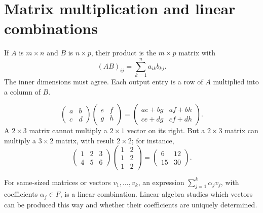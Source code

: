 \section{Matrix multiplication and linear combinations}
\begin{definition}
If $A$ is $m\times n$ and $B$ is $n\times p$, their product is the
$m\times p$ matrix with
\[
(AB)_{ij}=\sum_{k=1}^n a_{ik}b_{kj}.
\]
The inner dimensions must agree. Each output entry is a row of $A$
multiplied into a column of $B$.
\end{definition}
\begin{example}
\[
\begin{pmatrix}a&b\\c&d\end{pmatrix}
\begin{pmatrix}e&f\\g&h\end{pmatrix}
=\begin{pmatrix}ae+bg&af+bh\\ce+dg&cf+dh\end{pmatrix}.
\]
A $2\times3$ matrix cannot multiply a $2\times1$ vector on its right.
But a $2\times3$ matrix can multiply a $3\times2$ matrix, with result
$2\times2$; for instance,
\[
\begin{pmatrix}1&2&3\\4&5&6\end{pmatrix}
\begin{pmatrix}1&2\\1&2\\1&2\end{pmatrix}
=\begin{pmatrix}6&12\\15&30\end{pmatrix}.
\]
\end{example}

\begin{definition}
For same-sized matrices or vectors $v_1,\ldots,v_k$, an expression
$\sum_{j=1}^k\alpha_jv_j$, with coefficients $\alpha_j\in F$, is a linear
combination. Linear algebra studies which vectors can be produced this way
and whether their coefficients are uniquely determined.
\end{definition}

